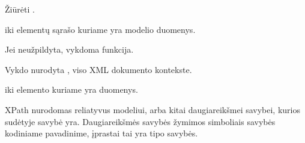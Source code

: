 \documentclass[letterpaper,10pt,lithuanian]{sphinxmanual}
\begin{document}
\begin{fulllineitems}

\pysigstartsignatures
{}
\pysigstopsignatures
\sphinxAtStartPar
Žiūrėti {\hyperref[\detokenize{formules:failai}]{}}.

\end{fulllineitems}



\begin{fulllineitems}

\pysigstartsignatures
{}
\pysigstopsignatures
\sphinxAtStartPar
{} iki elementų sąrašo kuriame
yra modelio duomenys.

\end{fulllineitems}



\begin{fulllineitems}

\pysigstartsignatures
{}
\pysigstopsignatures
\sphinxAtStartPar
Jei neužpildyta, vykdoma  funkcija.

\begin{fulllineitems}
\label{\detokenize{saltiniai:id0}}
\pysigstartsignatures
{}
\pysigstopsignatures
\sphinxAtStartPar
Vykdo nurodyta , viso XML dokumento kontekste.

\end{fulllineitems}


\end{fulllineitems}



\begin{fulllineitems}

\pysigstartsignatures
{}
\pysigstopsignatures
\sphinxAtStartPar
{} iki elemento kuriame yra
duomenys.

\sphinxAtStartPar
XPath nurodomas reliatyvus modeliui, arba kitai daugiareikšmei savybei,
kurios sudėtyje savybė yra. Daugiareikšmės savybės žymimos \sphinxcode{\sphinxupquote{{[}{]}}} simboliais
savybės kodiniame pavadinime, įprastai tai yra  tipo savybės.

\end{fulllineitems}
\end{document}
